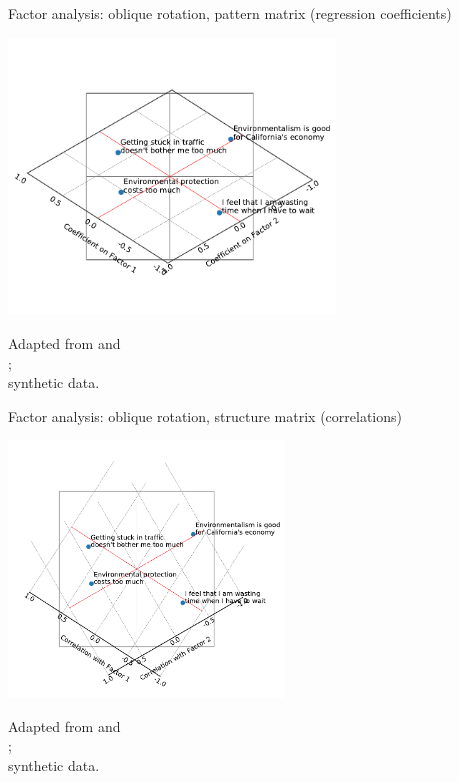 \begin{frame}{Factor analysis: oblique rotation, pattern matrix (regression coefficients)}
  \begin{center}
    \vspace*{-2cm}
    \includegraphics[width=0.65\textwidth]{fig/factor_oblimin_pattern.pdf}\\
  \end{center}
  \vspace*{-3cm}
  {\tiny Adapted from \textcite{kline_easy_1994} and\\\textcite{kitamura_micro-analysis_1997};\\synthetic data.}
\end{frame}

\begin{frame}{Factor analysis: oblique rotation, structure matrix (correlations)}
  \begin{center}
    \vspace*{-3cm}
    \includegraphics[width=0.55\textwidth]{fig/factor_oblimin_structure.pdf}\\
  \end{center}
  \vspace*{-3cm}
  {\tiny Adapted from \textcite{kline_easy_1994} and\\\textcite{kitamura_micro-analysis_1997};\\synthetic data.}
\end{frame}
